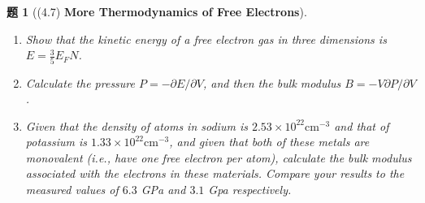 \documentclass[UTF8,10pt,a4paper]{article}
\theoremstyle{Problem}
\newtheorem{prob}{题}
\theoremstyle{Solution}
\begin{document}
\begin{prob}[(4.7) \textbf{More Thermodynamics of Free Electrons}]
    \begin{enumerate}
        \item[(a)] Show that the kinetic energy of a free electron gas in three dimensions is $E=\frac{3}{5}E_FN$.
        \item[(b)] Calculate the pressure $P=-\partial E/\partial V$, and then the bulk modulus $B=-V\partial P/\partial V$.
        \item[(c)] Given that the density of atoms in sodium is $2.53\times 10^{22}\text{cm}^{-3}$ and that of potassium is $1.33\times 10^{22}\text{cm}^{-3}$, and given that both of these metals are monovalent (i.e., have one free electron per atom), calculate the bulk modulus associated with the electrons in these materials. Compare your results to the measured values of $6.3$ GPa and $3.1$ Gpa respectively.
    \end{enumerate}
\end{prob}
\end{document}
